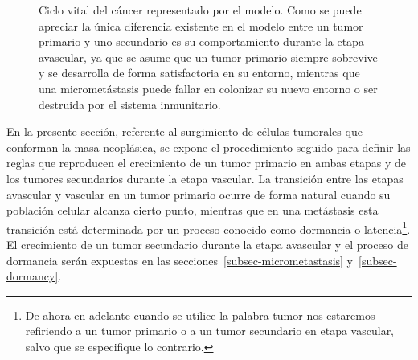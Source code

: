 \begin{figure}[!ht]
\begin{center}
\end{center}\vspace*{-0.6cm}
\caption[Ciclo vital del c\'ancer representado por el modelo]{Ciclo vital del c\'ancer representado por el modelo. Como se puede apreciar la \'unica diferencia existente en el modelo entre un tumor primario y uno secundario es su comportamiento durante la etapa avascular, ya que se asume que un tumor primario siempre sobrevive y se desarrolla de forma satisfactoria en su entorno, mientras que una micromet\'astasis puede fallar en colonizar su nuevo entorno o ser destruida por el sistema inmunitario.}
\label{fig-tumor-progresion}
\end{figure}

En la presente secci\'on, referente al surgimiento de c\'elulas tumorales que conforman la masa neopl\'asica, se expone el procedimiento seguido para definir las reglas que reproducen el crecimiento de un tumor primario en ambas etapas y de los tumores secundarios durante la etapa vascular. La transici\'on entre las etapas avascular y vascular en un tumor primario ocurre de forma natural cuando su poblaci\'on celular alcanza cierto punto, mientras que en una met\'astasis esta transici\'on est\'a determinada por un proceso conocido como dormancia o latencia\footnote{De ahora en adelante cuando se utilice la palabra tumor nos estaremos refiriendo a un tumor primario o a un tumor secundario en etapa vascular, salvo que se especifique lo contrario.}. El crecimiento de un tumor secundario durante la etapa avascular y el proceso de dormancia ser\'an expuestas en las secciones~\ref{subsec-micrometastasis} y~\ref{subsec-dormancy}. 

